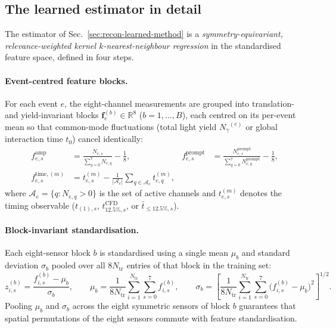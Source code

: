 \documentclass[11pt,a4paper]{article}
\newcommand{\ngam}{\ensuremath{N_{\gamma}}}
\begin{document}
\subsection{The learned estimator in detail}
\label{app:recon-estimator}

The estimator of Sec.~\ref{sec:recon-learned-method} is a
\emph{symmetry-equivariant, relevance-weighted kernel $k$-nearest-neighbour
regression} in the standardised feature space, defined in four steps.

\paragraph{Event-centred feature blocks.}
For each event $e$, the eight-channel measurements are grouped into
translation- and yield-invariant blocks $\mathbf{f}^{(b)}_e \in \mathbb{R}^8$
($b = 1,\dots,B$), each centred on its per-event mean so that common-mode
fluctuations (total light yield $\ngam^{(e)}$ or global interaction time
$t_0$) cancel identically:
\begin{align}
  f^{\mathrm{amp}}_{e,s} &= \frac{N_{e,s}}{\sum_{q=0}^7 N_{e,q}} - \frac{1}{8}, &
  f^{\mathrm{prompt}}_{e,s} &= \frac{N^{\mathrm{prompt}}_{e,s}}{\sum_{q=0}^7 N^{\mathrm{prompt}}_{e,q}} - \frac{1}{8}, \nonumber\\[3pt]
  f^{\mathrm{time},(m)}_{e,s} &= t^{(m)}_{e,s} - \frac{1}{|\mathcal{A}_e|}\sum_{q\in\mathcal{A}_e} t^{(m)}_{e,q}, & &
  \label{eq:feat-blocks}
\end{align}
where $\mathcal{A}_e = \{q : N_{e,q} > 0\}$ is the set of active channels
and $t^{(m)}_{e,s}$ denotes the timing observable ($t_{(1),s}$,
$t^{\mathrm{CFD}}_{12.5\%,s}$, or $\bar t_{\le 12.5\%,s}$).

\paragraph{Block-invariant standardisation.}
Each eight-sensor block $b$ is standardised using a single mean $\mu_b$
and standard deviation $\sigma_b$ pooled over all $8 N_{\mathrm{tr}}$
entries of that block in the training set:
\begin{equation}
  z^{(b)}_{i,s} = \frac{f^{(b)}_{i,s} - \mu_b}{\sigma_b},
  \qquad
  \mu_b = \frac{1}{8 N_{\mathrm{tr}}}\sum_{i=1}^{N_{\mathrm{tr}}}\sum_{s=0}^{7} f^{(b)}_{i,s},
  \qquad
  \sigma_b = \left[\frac{1}{8 N_{\mathrm{tr}}}\sum_{i=1}^{N_{\mathrm{tr}}}\sum_{s=0}^{7}\bigl(f^{(b)}_{i,s}-\mu_b\bigr)^2\right]^{1/2}.
  \label{eq:block-std}
\end{equation}
Pooling $\mu_b$ and $\sigma_b$ across the eight symmetric sensors of
block $b$ guarantees that spatial permutations of the eight sensors
commute with feature standardisation.
\end{document}
